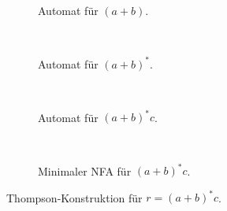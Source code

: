 \documentclass[11pt, a4paper]{article}
\theoremstyle{definition}
\theoremstyle{plain}
\numberwithin{equation}{section}
\begin{document}
\begin{figure}
	\centering
	\begin{subfigure}{.99\textwidth}
		\centering
		
		\caption{Automat für $(a+b)$.}
		\label{fig:thompson_example_1}
	\end{subfigure}\\
	\begin{subfigure}{.99\textwidth}
		\centering
		
		\caption{Automat für $(a+b)^\ast$.}
		\label{fig:thompson_example_2}
	\end{subfigure}\\
	\begin{subfigure}{.99\textwidth}
		\centering
		
		\caption{Automat für $(a+b)^\ast c$.}
		\label{fig:thompson_example_3}
	\end{subfigure}\\
	\begin{subfigure}{.99\textwidth}
		\centering
		
		\caption{Minimaler NFA für $(a+b)^\ast c$.}
		\label{fig:thompson_example_4}
	\end{subfigure}
	\caption{Thompson-Konstruktion für $r = (a+b)^\ast c$.}
	\label{fig:thompson_example}
\end{figure}
\end{document}
